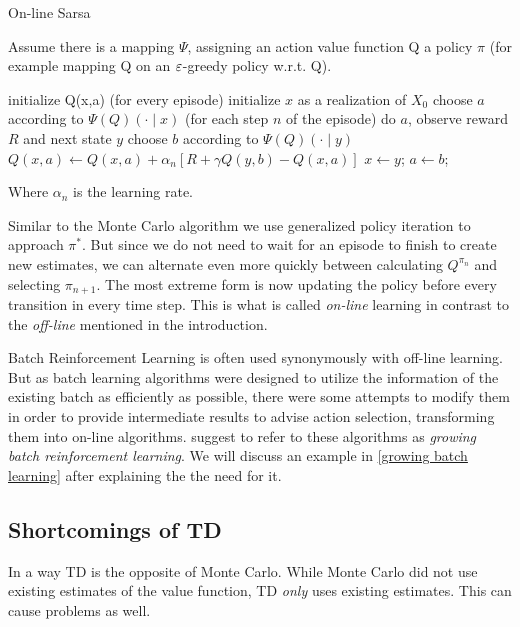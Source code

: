 \begin{algorithm}
	\caption{On-line Sarsa \parencite{suttonReinforcementLearningIntroduction1998}}
	Assume there is a mapping \(\Psi\), assigning an action value function Q a policy \(\pi\) (for example mapping Q on an \(\varepsilon\)-greedy policy w.r.t. Q).
	\begin{algorithmic}[1]
		\State initialize Q(x,a)
		 (for every episode)
			\State initialize \(x\) as a realization of \(X_0\)
			\State choose \(a\) according to \(\Psi(Q)(\cdot \mid x)\)
			\Repeat(for each step \(n\) of the episode)
				\State do \(a\), observe reward \(R\) and next state \(y\)
				\State choose \(b\) according to \(\Psi(Q)(\cdot \mid y)\)
				\State \(Q(x,a)\gets Q(x,a) + \alpha_n [R+\gamma Q(y,b) -Q(x,a) ]\)
				\State \(x\gets y\); \(a\gets b \);
		\EndWhile
	\end{algorithmic}
	Where \(\alpha_n\) is the learning rate.
\end{algorithm}

Similar to the Monte Carlo algorithm we use generalized policy iteration to approach \(\pi^*\). But since we do not need to wait for an episode to finish to create new estimates, we can alternate even more quickly between calculating \(Q^{\pi_n}\) and selecting \(\pi_{n+1}\). The most extreme form is now updating the policy before every transition in every time step. This is what is called \emph{on-line} learning in contrast to the \emph{off-line} mentioned in the introduction. 

Batch Reinforcement Learning is often used synonymously with off-line learning. But as batch learning algorithms were designed to utilize the information of the existing batch as efficiently as possible, there were some attempts to modify them in order to provide intermediate results to advise action selection, transforming them into on-line algorithms. \textcite{langeBatchReinforcementLearning2012} suggest to refer to these algorithms as \emph{growing batch reinforcement learning}. We will discuss an example in \ref{growing batch learning} after explaining the the need for it. 

\subsection{Shortcomings of TD} \label{shortcomings TD}
In a way TD is the opposite of Monte Carlo. While Monte Carlo did not use existing estimates of the value function, TD \emph{only} uses existing estimates. This can cause problems as well.


